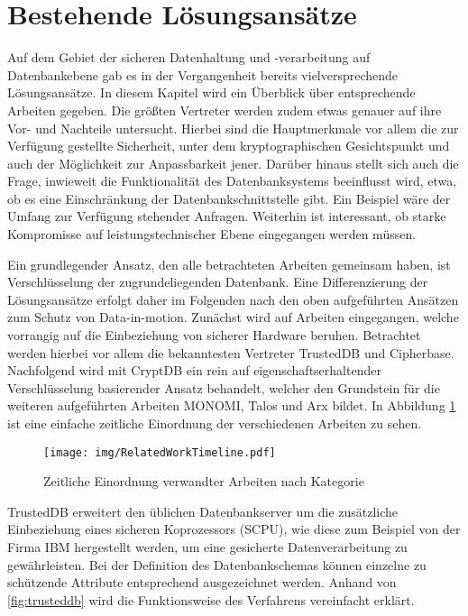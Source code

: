 \section{Bestehende Lösungsansätze}

Auf dem Gebiet der sicheren Datenhaltung und -verarbeitung auf Datenbankebene gab es in der Vergangenheit bereits vielversprechende Lösungsansätze. In diesem Kapitel wird ein Überblick über entsprechende Arbeiten gegeben. Die größten Vertreter werden zudem etwas genauer auf ihre Vor- und Nachteile untersucht. Hierbei sind die Hauptmerkmale vor allem die zur Verfügung gestellte Sicherheit, unter dem kryptographischen Gesichtspunkt und auch der Möglichkeit zur Anpassbarkeit jener. Darüber hinaus stellt sich auch die Frage, inwieweit die Funktionalität des Datenbanksystems beeinflusst wird, etwa, ob es eine Einschränkung der Datenbankschnittstelle gibt. Ein Beispiel wäre der Umfang zur Verfügung stehender Anfragen. Weiterhin ist interessant, ob starke Kompromisse auf leistungstechnischer Ebene eingegangen werden müssen.

Ein grundlegender Ansatz, den alle betrachteten Arbeiten gemeinsam haben, ist Verschlüsselung der zugrundeliegenden Datenbank. Eine Differenzierung der Lösungsansätze erfolgt daher im Folgenden nach den oben aufgeführten Ansätzen zum Schutz von Data-in-motion. Zunächst wird auf Arbeiten eingegangen, welche vorrangig auf die Einbeziehung von sicherer Hardware beruhen. Betrachtet werden hierbei vor allem die bekanntesten Vertreter TrustedDB und Cipherbase. Nachfolgend wird mit CryptDB ein rein auf eigenschaftserhaltender Verschlüsselung basierender Ansatz behandelt, welcher den Grundstein für die weiteren aufgeführten Arbeiten MONOMI, Talos und Arx bildet. In Abbildung \ref{fig:timeline} ist eine einfache zeitliche Einordnung der verschiedenen Arbeiten zu sehen.

\begin{figure}
	\texttt{[image: img/RelatedWorkTimeline.pdf]}
	\centering
	\caption{Zeitliche Einordnung verwandter Arbeiten nach Kategorie}
	\label{fig:timeline}
\end{figure}

TrustedDB \cite{Bajaj2013} erweitert den üblichen Datenbankserver um die zusätzliche Einbeziehung eines sicheren Koprozessors (SCPU), wie diese zum Beispiel von der Firma IBM hergestellt werden, um eine gesicherte Datenverarbeitung zu gewährleisten. Bei der Definition des Datenbankschemas können einzelne zu schützende Attribute entsprechend ausgezeichnet werden. Anhand von \ref{fig:trusteddb} wird die Funktionsweise des Verfahrens vereinfacht erklärt. 

